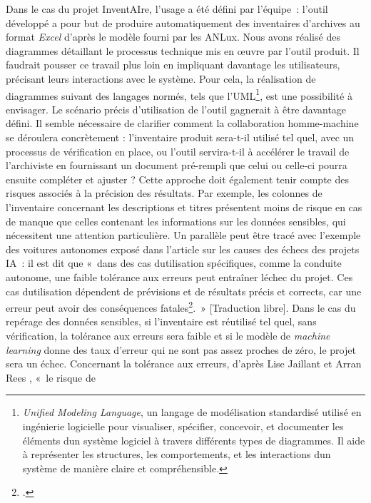 Dans le cas du projet InventAIre, l'usage a été défini par l'équipe~:
l'outil développé a pour but de produire automatiquement des inventaires
d'archives au format \emph{Excel} d'après le modèle fourni par les
ANLux. Nous avons réalisé des diagrammes détaillant le
processus technique mis en œuvre par l'outil produit. Il faudrait
pousser ce travail plus loin en impliquant davantage les
utilisateurs, précisant leurs interactions avec le système. Pour
cela, la réalisation de diagrammes suivant des langages normés, tels que
l'UML\footnote{\emph{Unified Modeling Language}, un langage de modélisation
	standardisé utilisé en ingénierie logicielle pour visualiser,
	spécifier, concevoir, et documenter les éléments d\textquotesingle un
	système logiciel à travers différents types de diagrammes. Il aide à
	représenter les structures, les comportements, et les interactions
	d\textquotesingle un système de manière claire et compréhensible.},
est une possibilité à envisager. Le scénario précis d'utilisation de
l'outil gagnerait à être davantage défini. Il semble nécessaire de
clarifier comment la collaboration homme-machine se déroulera
concrètement : l'inventaire produit sera-t-il utilisé tel quel, avec un
processus de vérification en place, ou l'outil servira-t-il à accélérer
le travail de l'archiviste en fournissant un document pré-rempli que
celui ou celle-ci pourra ensuite compléter et ajuster ? Cette approche doit
également tenir compte des risques associés à la précision des résultats. Par exemple, les colonnes de l'inventaire concernant les descriptions et titres
présentent moins de risque en cas de manque  que celles
contenant les informations sur les données sensibles, qui nécessitent une
attention particulière. Un parallèle peut être tracé avec l'exemple des
voitures autonomes exposé dans l'article sur les causes des échecs des
projets IA~: il est dit que «~dans des cas d\textquotesingle utilisation
spécifiques, comme la conduite autonome, une faible tolérance aux
erreurs peut entraîner l\textquotesingle échec du projet. Ces cas
d\textquotesingle utilisation dépendent de prévisions et de résultats
précis et corrects, car une erreur peut avoir des conséquences
fatales\footcite{westenberger_failure_2022}.~» {[}Traduction libre{]}. Dans le cas du repérage
des données sensibles, si l'inventaire est réutilisé tel quel, sans
vérification, la tolérance aux erreurs sera faible et si le modèle de
\emph{machine learning} donne des taux d'erreur qui ne sont pas assez
proches de zéro, le projet sera un échec. Concernant la tolérance aux
erreurs, d'après Lise Jaillant et Arran Rees , «~le risque de
